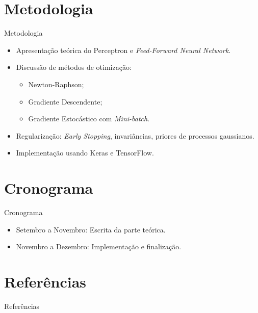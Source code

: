 \documentclass[11pt]{beamer}
\begin{document}
	\section{Metodologia}
	\begin{frame}{Metodologia}
		\begin{itemize}
			\item Apresentação teórica do Perceptron e \textit{Feed-Forward Neural Network}.
			\item Discussão de métodos de otimização:
			\begin{itemize}
				\item Newton-Raphson;
				\item Gradiente Descendente;
				\item Gradiente Estocástico com \textit{Mini-batch}.
			\end{itemize}
			\item Regularização: \textit{Early Stopping}, invariâncias, priores de processos gaussianos.
			\item Implementação usando Keras e TensorFlow.
		\end{itemize}
	\end{frame}
	
	\section{Cronograma}
	\begin{frame}{Cronograma}
		\begin{itemize}
			\item Setembro a Novembro: Escrita da parte teórica.
			\item Novembro a Dezembro: Implementação e finalização.
		\end{itemize}
	\end{frame}
	
	\section{Referências}
	\begin{frame}[allowframebreaks]{Referências}
		\printbibliography
	\end{frame}
	
\end{document}

